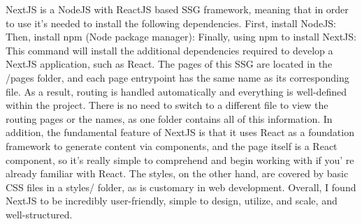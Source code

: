 \markdownRendererDocumentBegin
{}\markdownRendererInterblockSeparator
{}NextJS is a NodeJS with ReactJS based SSG framework, meaning that in order to use it's needed to install the following dependencies.\markdownRendererInterblockSeparator
{}\markdownRendererOlBeginTight
{}First, install NodeJS: \markdownRendererOlItemEnd 
{}Then, install npm (Node package manager): \markdownRendererOlItemEnd 
{}Finally, using npm to install NextJS: \markdownRendererOlItemEnd 
\markdownRendererOlEndTight \markdownRendererInterblockSeparator
{}This command will install the additional dependencies required to develop a NextJS application, such as React. The pages of this SSG are located in the /pages folder, and each page entrypoint has the same name as its corresponding file. As a result, routing is handled automatically and everything is well-defined within the project.\markdownRendererInterblockSeparator
{}There is no need to switch to a different file to view the routing pages or the names, as one folder contains all of this information.\markdownRendererInterblockSeparator
{}In addition, the fundamental feature of NextJS is that it uses React as a foundation framework to generate content via components, and the page itself is a React component, so it's really simple to comprehend and begin working with if you' re already familiar with React.\markdownRendererInterblockSeparator
{}The styles, on the other hand, are covered by basic CSS files in a styles/ folder, as is customary in web development.\markdownRendererInterblockSeparator
{}Overall, I found NextJS to be incredibly user-friendly, simple to design, utilize, and scale, and well-structured.\markdownRendererDocumentEnd